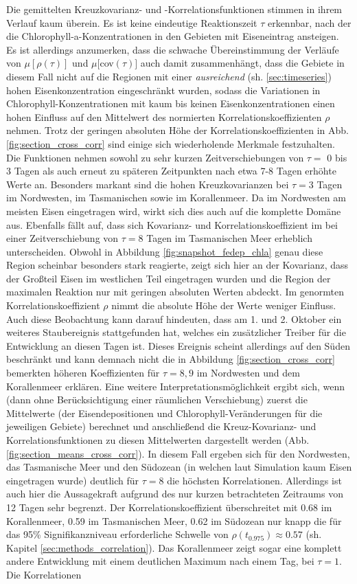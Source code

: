 \documentclass[12pt,a4paper,onecolumn,headheight=30pt]{scrartcl}
\begin{document}
Die gemittelten Kreuzkovarianz- und -Korrelationsfunktionen stimmen in ihrem Verlauf kaum überein. Es ist keine eindeutige Reaktionszeit $\tau$ erkennbar, nach der die Chlorophyll-a-Konzentrationen in den Gebieten mit Eiseneintrag ansteigen. Es ist allerdings anzumerken, dass die schwache Übereinstimmung der Verläufe von $\mu[\rho(\tau)]$ und $\mu[$cov$(\tau)]$ auch damit zusammenhängt, dass die Gebiete in diesem Fall nicht auf die Regionen mit einer \textit{ausreichend} (sh. \ref{sec:timeseries}) hohen Eisenkonzentration eingeschränkt wurden, sodass die Variationen in Chlorophyll-Konzentrationen mit kaum bis keinen Eisenkonzentrationen einen hohen Einfluss auf den Mittelwert des normierten Korrelationskoeffizienten $\rho$ nehmen. Trotz der geringen absoluten Höhe der Korrelationskoeffizienten in Abb. \ref{fig:section_cross_corr} sind einige sich wiederholende Merkmale festzuhalten. Die Funktionen nehmen sowohl zu sehr kurzen Zeitverschiebungen von $\tau=$ 0 bis 3 Tagen als auch erneut zu späteren Zeitpunkten nach etwa 7-8 Tagen erhöhte Werte an. Besonders markant sind die hohen Kreuzkovarianzen bei $\tau=3$ Tagen im Nordwesten, im Tasmanischen sowie im Korallenmeer. Da im Nordwesten am meisten Eisen eingetragen wird, wirkt sich dies auch auf die komplette Domäne aus. Ebenfalls fällt auf, dass sich Kovarianz- und Korrelationskoeffizient im bei einer Zeitverschiebung von $\tau=8$ Tagen im Tasmanischen Meer erheblich unterscheiden. Obwohl in Abbildung \ref{fig:snapshot_fedep_chla} genau diese Region scheinbar besonders stark reagierte, zeigt sich hier an der Kovarianz, dass der Großteil Eisen im westlichen Teil eingetragen wurden und die Region der maximalen Reaktion nur mit geringen absoluten Werten abdeckt. Im genormten Korrelationskoeffizient $\rho$ nimmt die absolute Höhe der Werte weniger Einfluss. Auch diese Beobachtung kann darauf hindeuten, dass am 1. und 2. Oktober ein weiteres Staubereignis stattgefunden hat, welches ein zusätzlicher Treiber für die Entwicklung an diesen Tagen ist. Dieses Ereignis scheint allerdings auf den Süden beschränkt und kann demnach nicht die in Abbildung \ref{fig:section_cross_corr} bemerkten höheren Koeffizienten für $\tau=8,9$ im Nordwesten und dem Korallenmeer erklären. Eine weitere Interpretationsmöglichkeit ergibt sich, wenn (dann ohne Berücksichtigung einer räumlichen Verschiebung) zuerst die Mittelwerte (der Eisendepositionen und Chlorophyll-Veränderungen für die jeweiligen Gebiete) berechnet und anschließend die Kreuz-Kovarianz- und Korrelationsfunktionen zu diesen Mittelwerten dargestellt werden (Abb. \ref{fig:section_means_cross_corr}). In diesem Fall ergeben sich für den Nordwesten, das Tasmanische Meer und den Südozean (in welchen laut Simulation kaum Eisen eingetragen wurde) deutlich für $\tau=8$ die höchsten Korrelationen. Allerdings ist auch hier die Aussagekraft aufgrund des nur kurzen betrachteten Zeitraums von 12 Tagen sehr begrenzt. Der Korrelationskoeffizient überschreitet mit 0.68 im Korallenmeer, 0.59 im Tasmanischen Meer, 0.62 im Südozean nur knapp die für das 95\% Signifikanzniveau erforderliche Schwelle von $\rho(t_{0.975})\approx0.57$ (sh. Kapitel \ref{sec:methods_correlation}). Das Korallenmeer zeigt sogar eine komplett andere Entwicklung mit einem deutlichen Maximum nach einem Tag, bei $\tau=1$. Die Korrelationen 
\end{document}
